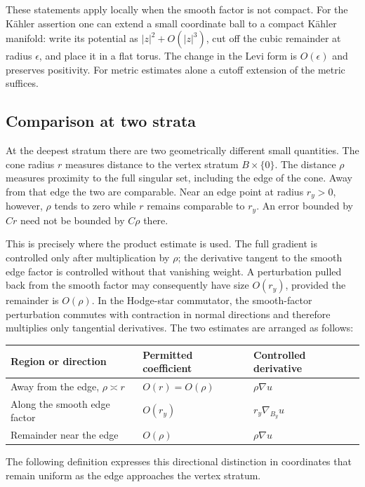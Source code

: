 These statements apply locally when the smooth factor is not
compact. For the K\"ahler assertion one can extend a small
coordinate ball to a compact K\"ahler manifold: write its
potential as $|z|^2+O(|z|^3)$, cut off the cubic remainder at
radius $\epsilon$, and place it in a flat torus. The change in
the Levi form is $O(\epsilon)$ and preserves positivity. For
metric estimates alone a cutoff extension of the metric suffices.

\subsection{Comparison at two strata}
At the deepest stratum there are two geometrically different small
quantities. The cone radius $r$ measures distance to the vertex
stratum $B\times\{0\}$. The distance $\rho$ measures proximity
to the full singular set, including the edge of the cone. Away
from that edge the two are comparable. Near an edge point at radius
$r_y>0$, however, $\rho$ tends to zero while $r$ remains comparable
to $r_y$. An error bounded by $Cr$ need not be bounded by
$C\rho$ there.

This is precisely where the product estimate is used. The full
gradient is controlled only after multiplication by $\rho$;
the derivative tangent to the smooth edge factor is controlled
without that vanishing weight. A perturbation pulled back from
the smooth factor may consequently have size $O(r_y)$, provided
the remainder is $O(\rho)$. In the Hodge-star commutator, the
smooth-factor perturbation commutes with contraction in normal
directions and therefore multiplies only tangential derivatives.
The two estimates are arranged as follows:
\begin{center}
\begin{tabular}{lll}
\toprule
Region or direction & Permitted coefficient & Controlled derivative\\
\midrule
Away from the edge, $\rho\asymp r$ & $O(r)=O(\rho)$ & $\rho\nabla u$\\
Along the smooth edge factor & $O(r_y)$ & $r_y\nabla_{B_y}u$\\
Remainder near the edge & $O(\rho)$ & $\rho\nabla u$\\
\bottomrule
\end{tabular}
\end{center}
The following definition expresses this directional distinction
in coordinates that remain uniform as the edge approaches the
vertex stratum.

